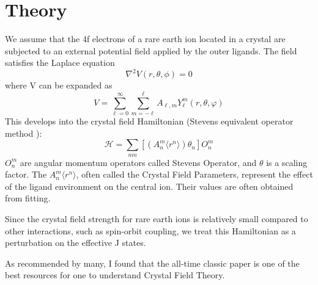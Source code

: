 \documentclass{article}
\begin{document}
\appendix

\section{Theory}
We assume that the 4f electrons of a rare earth ion located in a crystal are subjected to an external potential field applied by the outer ligands. The field satisfies the Laplace equation
$$\nabla^2V(r, \theta, \phi)=0$$
where V can be expanded as 
$$ V =\sum _{\ell =0}^{\infty }\sum _{m=-\ell }^{\ell }A_{\ell, m}Y_{\ell }^{m}(r, \theta ,\varphi)$$
This develops into the crystal field Hamiltonian (Stevens equivalent operator method \cite{stevensMatrixElementsOperator1952}):
$$\mathscr{H}=\sum_{nm}[(A_n^m\langle r^n \rangle )\theta_n]O_n^m$$
$O_n^m$ are angular momentum operators called Stevens Operator, and $\theta$ is a scaling factor. The $A_n^m\langle r^n \rangle$, often called the Crystal Field Parameters, represent the effect of the ligand environment on the central ion. Their values are often obtained from fitting.

Since the crystal field strength for rare earth ions is relatively small compared to other interactions, such as spin-orbit coupling, we treat this Hamiltonian as a perturbation on the effective J states.

As recommended by many, I found that the all-time classic paper \cite{hutchingsPointChargeCalculationsEnergy1964} is one of the best resources for one to understand Crystal Field Theory.





 
\end{document}
